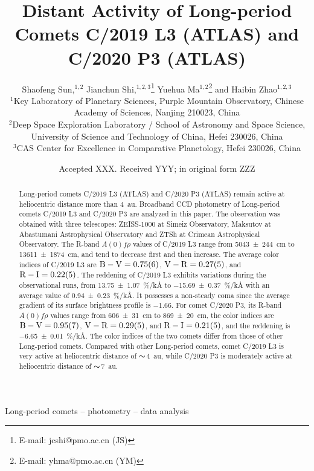 \documentclass[fleqn,usenatbib]{mnras}
\title[Distant Activity of C/2019 L3 and C/2020 P3]{Distant Activity of Long-period Comets C/2019 L3 (ATLAS) and C/2020 P3 (ATLAS)}
\author[Shaofeng Sun et al.]{
Shaofeng Sun,$^{1,2}$
Jianchun Shi,$^{1,2,3}$\thanks{E-mail: jcshi@pmo.ac.cn (JS)}
Yuehua Ma$^{1,2}$\thanks{E-mail: yhma@pmo.ac.cn (YM)}
and Haibin Zhao$^{1,2,3}$
\\
$^{1}$Key Laboratory of Planetary Sciences, Purple Mountain Observatory, Chinese Academy of Sciences, Nanjing 210023, China\\
$^{2}$Deep Space Exploration Laboratory / School of Astronomy and Space Science, University of Science and Technology of China, Hefei 230026, China\\
$^{3}$CAS Center for Excellence in Comparative Planetology, Hefei 230026, China
}
\date{Accepted XXX. Received YYY; in original form ZZZ}
\begin{document}
\label{firstpage}
\pagerange{\pageref{firstpage}--\pageref{lastpage}}
\maketitle


\begin{abstract}
	Long-period comets C/2019 L3 (ATLAS) and C/2020 P3 (ATLAS) remain active at heliocentric distance more than {\qty{4}{\astronomicalunit}}. Broadband CCD photometry of Long-period comets C/2019 L3 and C/2020 P3 are analyzed in this paper.
	The observation was obtained with three telescopes: ZEISS-1000 at Simeiz Observatory, Maksutov at Abastumani Astrophysical Observatory and ZTSh at Crimean Astrophysical Observatory. The R-band $A(0)f\rho$ values of C/2019 L3 range from {\SI{5043 +- 244}{\cm}} to {\SI{13611 +- 1874}{\cm}}, and tend to decrease first and then increase. The average color indices of C/2019 L3 are $\mathrm{B-V} = \num{0.75 +- 0.06}$, $\mathrm{V-R} = \num{0.27 +- 0.05}$, and $\mathrm{R-I} = \num{0.22 +- 0.05}$. The reddening of C/2019 L3 exhibits variations during the observational runs, from {\SI{13.75 +- 1.07}{\percent/\kilo\angstrom}} to {\SI{-15.69 +- 0.37}{\percent/\kilo\angstrom}} with an average value of {\SI{0.94 +- 0.23}{\percent/\kilo\angstrom}}. It possesses a non-steady coma since the average gradient of its surface brightness profile is \num{-1.66}. For comet C/2020 P3, its R-band $A(0)f\rho$ values range from {\SI{606 +- 31}{\cm}} to {\SI{869 +- 20}{\cm}}, the color indices are $\mathrm{B-V} = \num{0.95 +- 0.07}$, $\mathrm{V-R} = \num{0.29 +- 0.05}$, and $\mathrm{R-I} = \num{0.21 +- 0.05}$, and the reddening is {\SI{-6.65 +- 0.01}{\percent/\kilo\angstrom}}. The color indices of the two comets differ from those of other Long-period comets. Compared with other Long-period comets, comet C/2019 L3 is very active at heliocentric distance of $\thicksim${\qty{4}{\astronomicalunit}}, while C/2020 P3 is moderately active at heliocentric distance of $\thicksim${\qty{7}{\astronomicalunit}}. 
\end{abstract}

\begin{keywords}
Long-period comets -- photometry -- data analysis
\end{keywords}

\end{document}

